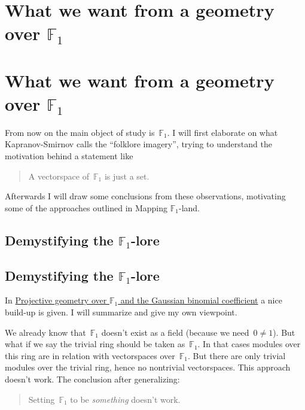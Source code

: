 \iftex
\section[What we want from a geometry over F\_1]{What we want from a geometry over $\mathbb{F}_1$}
\fi
\ifblog
\section{What we want from a geometry over $\mathbb{F}_1$}
\fi

From now on the main object of study is~$\mathbb{F}_1$. I will first elaborate on what Kapranov-Smirnov calls the ``folklore imagery'', trying to understand the motivation behind a statement like

\begin{quote}
  A vectorspace of~$\mathbb{F}_1$ is just a set.
\end{quote}

Afterwards I will draw some conclusions from these observations, motivating some of the approaches outlined in \iftex\cite{mapping-fun}\fi\ifblog Mapping $\mathbb{F}_1$-land\fi.


\iftex
\subsection[Demystifying the F\_1-lore]{Demystifying the $\mathbb{F}_1$-lore}
\fi
\ifblog
\subsection{Demystifying the $\mathbb{F}_1$-lore}
\fi
In \iftex \cite{projective-geometry-over-f1} \fi\ifblog \href{http://arxiv.org/abs/math/0407093}{Projective geometry over $\mathbb{F}_1$ and the Gaussian binomial coefficient} \fi a nice build-up is given. I will summarize and give my own viewpoint.

We already know that~$\mathbb{F}_1$ doesn't exist as a field (because we need~$0\neq 1$). But what if we say the trivial ring should be taken as~$\mathbb{F}_1$. In that cases modules over this ring are in relation with vectorspaces over~$\mathbb{F}_1$. But there are only trivial modules over the trivial ring, hence no nontrivial vectorspaces. This approach doesn't work. The conclusion after generalizing:

\begin{quote}
  Setting~$\mathbb{F}_1$ to be \emph{something} doesn't work.
\end{quote}

